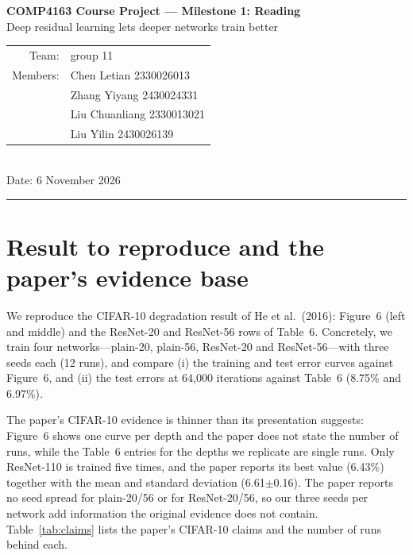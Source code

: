 \documentclass[11pt,a4paper]{article}
\newcommand{\paper}{He et al.\ (2016)}
\begin{document}
\begin{center}
{\Large\bfseries COMP4163 Course Project --- Milestone 1: Reading}\\[4pt]
{\large Deep residual learning lets deeper networks train better}\\[6pt]
\begin{tabular}{@{}rl@{}}
Team: & group 11 \\
Members: & Chen Letian 2330026013 \\
         & Zhang Yiyang 2430024331 \\
         & Liu Chuanliang 2330013021 \\
         & Liu Yilin 2430026139 \\
\end{tabular}\\[6pt]
Date: 6 November 2026
\end{center}

\vspace{-2pt}
\noindent\rule{\textwidth}{0.4pt}

\section{Result to reproduce and the paper's evidence base}

We reproduce the CIFAR-10 degradation result of \paper{}: Figure~6 (left and middle) and the ResNet-20 and ResNet-56 rows of Table~6. Concretely, we train four networks---plain-20, plain-56, ResNet-20 and ResNet-56---with three seeds each (12 runs), and compare (i) the training and test error curves against Figure~6, and (ii) the test errors at 64{,}000 iterations against Table~6 (8.75\% and 6.97\%).

The paper's CIFAR-10 evidence is thinner than its presentation suggests: Figure~6 shows one curve per depth and the paper does not state the number of runs, while the Table~6 entries for the depths we replicate are single runs. Only ResNet-110 is trained five times, and the paper reports its best value (6.43\%) together with the mean and standard deviation (6.61$\pm$0.16). The paper reports no seed spread for plain-20/56 or for ResNet-20/56, so our three seeds per network add information the original evidence does not contain. Table~\ref{tab:claims} lists the paper's CIFAR-10 claims and the number of runs behind each.
\end{document}
